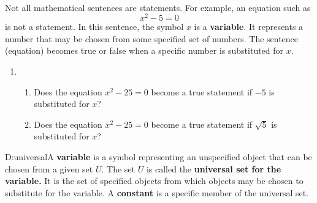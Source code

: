 \begin{previewactivity} \label{PA:variable} \hfill \\
Not all mathematical sentences are statements.  For example, an equation such as
\[
x^2  - 5 = 0
\]
is not a statement.  In this sentence, the symbol  $x$  is a \textbf{variable}.   It represents a number that may be chosen from some specified set of numbers.  The sentence (equation) becomes true or false when a specific number is substituted for $x$.
\begin{enumerate}
\item   \begin{enumerate}
    \item Does the equation $x^2 - 25 = 0$ become a true statement if $-5$ is substituted for $x$? 
    \item Does the equation $x^2 - 25 = 0$ become a true statement if $\sqrt{5}$ is substituted for $x$?
  \end{enumerate}


\end{enumerate}
%
\begin{defbox}{D:universal}{A \textbf{variable}
%
 is a symbol representing an unspecified object that can be chosen from a given set $U$.  The set $U$ is called the \textbf{universal set for the variable.}
%
  It is the set of specified objects from which objects may be chosen to substitute for the variable.  A \textbf{constant}
%
 is a specific member of the universal set.}
\end{defbox}




\end{previewactivity}
